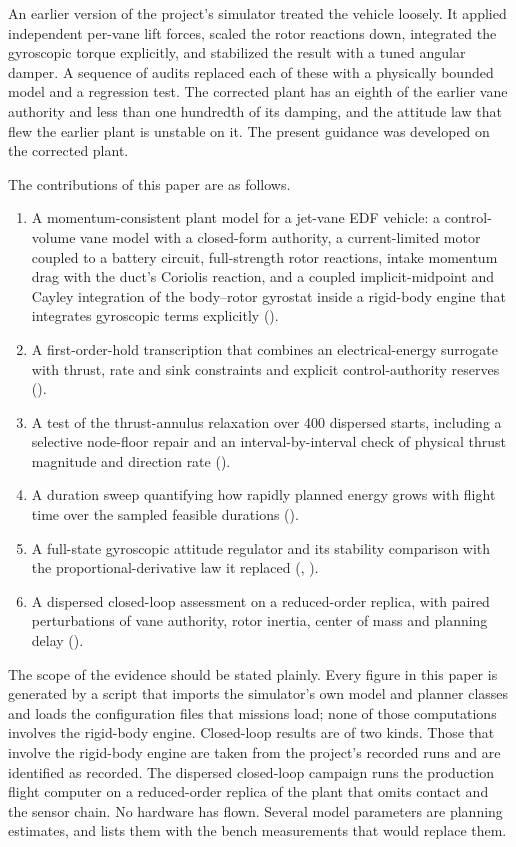 \documentclass[10pt,letterpaper]{article}
\begin{document}
An earlier version of the project's simulator treated the vehicle loosely.
It applied independent per-vane lift forces, scaled the rotor reactions down, integrated the gyroscopic torque explicitly, and stabilized the result with a tuned angular damper.
A sequence of audits replaced each of these with a physically bounded model and a regression test.
The corrected plant has an eighth of the earlier vane authority and less than one hundredth of its damping, and the attitude law that flew the earlier plant is unstable on it.
The present guidance was developed on the corrected plant.

The contributions of this paper are as follows.
\begin{enumerate}
\item A momentum-consistent plant model for a jet-vane EDF vehicle: a control-volume vane model with a closed-form authority, a current-limited motor coupled to a battery circuit, full-strength rotor reactions, intake momentum drag with the duct's Coriolis reaction, and a coupled implicit-midpoint and Cayley integration of the body--rotor gyrostat inside a rigid-body engine that integrates gyroscopic terms explicitly ().
\item A first-order-hold transcription that combines an electrical-energy surrogate with thrust, rate and sink constraints and explicit control-authority reserves ().
\item A test of the thrust-annulus relaxation over 400 dispersed starts, including a selective node-floor repair and an interval-by-interval check of physical thrust magnitude and direction rate ().
\item A duration sweep quantifying how rapidly planned energy grows with flight time over the sampled feasible durations ().
\item A full-state gyroscopic attitude regulator and its stability comparison with the proportional-derivative law it replaced (, ).
\item A dispersed closed-loop assessment on a reduced-order replica, with paired perturbations of vane authority, rotor inertia, center of mass and planning delay ().
\end{enumerate}

The scope of the evidence should be stated plainly.
Every figure in this paper is generated by a script that imports the simulator's own model and planner classes and loads the configuration files that missions load; none of those computations involves the rigid-body engine.
Closed-loop results are of two kinds.
Those that involve the rigid-body engine are taken from the project's recorded runs and are identified as recorded.
The dispersed closed-loop campaign runs the production flight computer on a reduced-order replica of the plant that omits contact and the sensor chain.
No hardware has flown.
Several model parameters are planning estimates, and  lists them with the bench measurements that would replace them.
\end{document}
